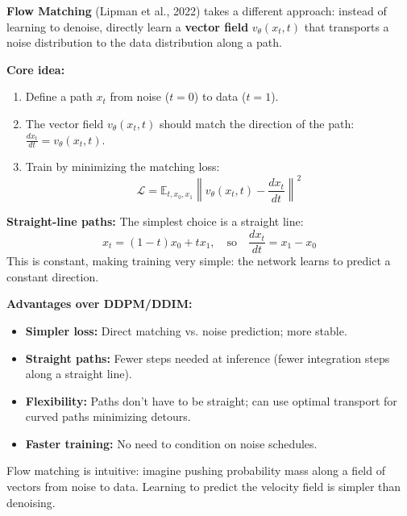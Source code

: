 \begin{paperbox}[title={Flow Matching: Learning Vector Fields}]
\textbf{Flow Matching} (Lipman et al., 2022) takes a different approach: instead of learning to denoise, directly learn a \textbf{vector field} $v_\theta(x_t, t)$ that transports a noise distribution to the data distribution along a path.

\textbf{Core idea:}
\begin{enumerate}
  \item Define a path $x_t$ from noise ($t=0$) to data ($t=1$).
  \item The vector field $v_\theta(x_t, t)$ should match the direction of the path: $\frac{dx_t}{dt} = v_\theta(x_t, t)$.
  \item Train by minimizing the matching loss:
  \[
  \mathcal{L} = \mathbb{E}_{t, x_0, x_1} \left\| v_\theta(x_t, t) - \frac{dx_t}{dt} \right\|^2
  \]
\end{enumerate}

\textbf{Straight-line paths:} The simplest choice is a straight line:
\[
x_t = (1-t) x_0 + t x_1, \quad \text{so} \quad \frac{dx_t}{dt} = x_1 - x_0
\]
This is constant, making training very simple: the network learns to predict a constant direction.

\textbf{Advantages over DDPM/DDIM:}
\begin{itemize}
  \item \textbf{Simpler loss:} Direct matching vs. noise prediction; more stable.
  \item \textbf{Straight paths:} Fewer steps needed at inference (fewer integration steps along a straight line).
  \item \textbf{Flexibility:} Paths don't have to be straight; can use optimal transport for curved paths minimizing detours.
  \item \textbf{Faster training:} No need to condition on noise schedules.
\end{itemize}

\begin{intuitionbox}
Flow matching is intuitive: imagine pushing probability mass along a field of vectors from noise to data. Learning to predict the velocity field is simpler than denoising.
\end{intuitionbox}
\end{paperbox}

